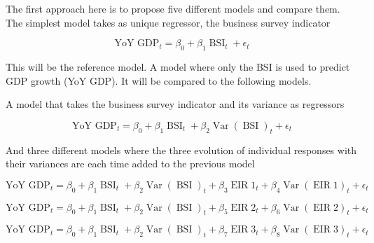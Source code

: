 \documentclass[12pt,a4paper,oneside]{book}
\DeclareMathOperator{\Var}{Var}
\DeclareMathOperator{\BSI}{BSI}
\DeclareMathOperator{\EIR}{EIR}
\begin{document}
The first approach here is to propose five different models and compare them.
The simplest model takes as unique regressor, the business survey indicator

\begin{equation} \tag{Model 1}
    \text{YoY GDP}_{t} = \beta_0 + \beta_{1} \BSI_{t} + \epsilon_t \label{eq:model1} 
\end{equation}

This will be the reference model. A model where only the BSI is used to predict GDP growth (YoY GDP). It will be compared to the following models.

A model that takes the business survey indicator and its variance as regressors

\begin{equation} \tag{Model 2}
    \text{YoY GDP}_{t} = \beta_0 + \beta_{1} \BSI_{t}  + \beta_{2} \Var(\BSI)_{t} + \epsilon_t \label{eq:model2}
\end{equation}

And three different models where the three evolution of individual responses with their variances are each time added to the previous model

\begin{equation} \tag{Model 3}
    \text{YoY GDP}_{t} = \beta_0 + \beta_{1} \BSI_{t}  + \beta_{2} \Var(\BSI)_{t} + \beta_{3} \EIR1_{t}  + \beta_{4} \Var(\EIR1)_{t} + \epsilon_t \label{eq:model3}
\end{equation}

\begin{equation} \tag{Model 4}
    \text{YoY GDP}_{t} = \beta_0 + \beta_{1} \BSI_{t}  + \beta_{2} \Var(\BSI)_{t} + \beta_{5} \EIR2_{t}  + \beta_{6} \Var(\EIR2)_{t} + \epsilon_t \label{eq:model4}
\end{equation}

\begin{equation} \tag{Model 5}
    \text{YoY GDP}_{t} = \beta_0 + \beta_{1} \BSI_{t}  + \beta_{2} \Var(\BSI)_{t} + \beta_{7} \EIR3_{t}  + \beta_{8} \Var(\EIR3)_{t} + \epsilon_t  \label{eq:model5}
\end{equation}
\end{document}
